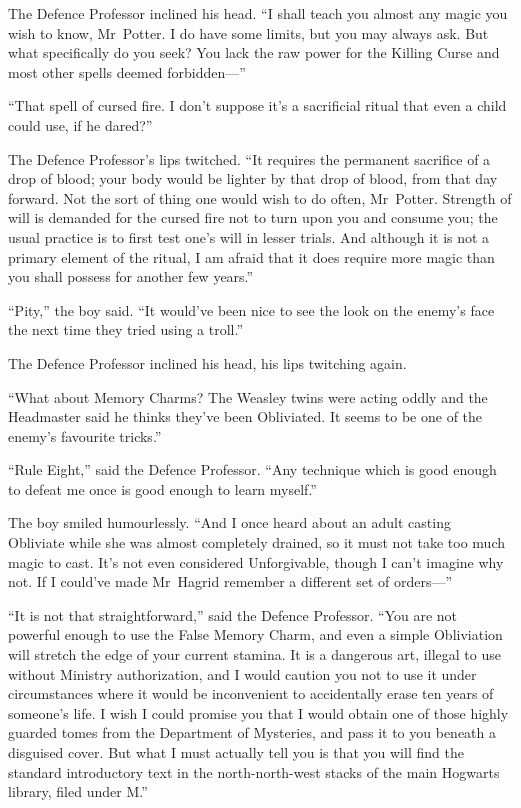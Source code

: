 The Defence Professor inclined his head. “I shall teach you almost any magic you wish to know, Mr~Potter. I do have some limits, but you may always ask. But what specifically do you seek? You lack the raw power for the Killing Curse and most other spells deemed forbidden—”

“That spell of cursed fire. I don’t suppose it’s a sacrificial ritual that even a child could use, if he dared?”

The Defence Professor’s lips twitched. “It requires the permanent sacrifice of a drop of blood; your body would be lighter by that drop of blood, from that day forward. Not the sort of thing one would wish to do often, Mr~Potter. Strength of will is demanded for the cursed fire not to turn upon you and consume you; the usual practice is to first test one’s will in lesser trials. And although it is not a primary element of the ritual, I am afraid that it does require more magic than you shall possess for another few years.”

“Pity,” the boy said. “It would’ve been nice to see the look on the enemy’s face the next time they tried using a troll.”

The Defence Professor inclined his head, his lips twitching again.

“What about Memory Charms? The Weasley twins were acting oddly and the Headmaster said he thinks they’ve been Obliviated. It seems to be one of the enemy’s favourite tricks.”

“Rule Eight,” said the Defence Professor. “Any technique which is good enough to defeat me once is good enough to learn myself.”

The boy smiled humourlessly. “And I once heard about an adult casting Obliviate while she was almost completely drained, so it must not take too much magic to cast. It’s not even considered Unforgivable, though I can’t imagine why not. If I could’ve made Mr~Hagrid remember a different set of orders—”

“It is not that straightforward,” said the Defence Professor. “You are not powerful enough to use the False Memory Charm, and even a simple Obliviation will stretch the edge of your current stamina. It is a dangerous art, illegal to use without Ministry authorization, and I would caution you not to use it under circumstances where it would be inconvenient to accidentally erase ten years of someone’s life. I wish I could promise you that I would obtain one of those highly guarded tomes from the Department of Mysteries, and pass it to you beneath a disguised cover. But what I must actually tell you is that you will find the standard introductory text in the north-north-west stacks of the main Hogwarts library, filed under M.”


